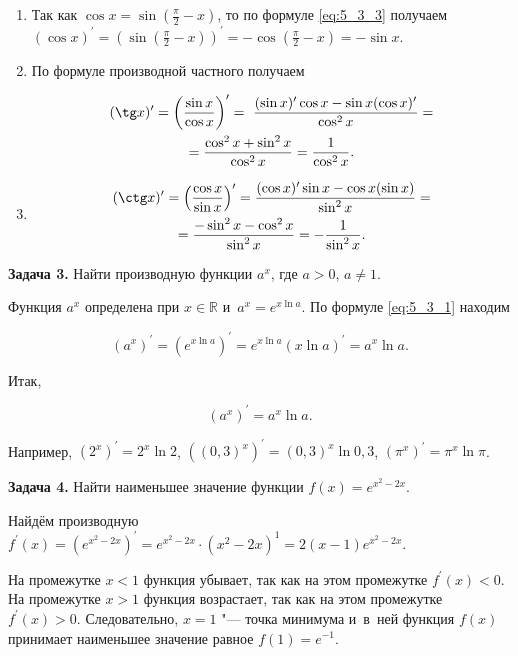 \begin{enumerate}
\item Так как $\displaystyle \cos x = \sin \left(\frac{\pi}{2} - x \right)$,
то по формуле \eqref{eq:5_3_3} получаем
$\displaystyle (\cos x)^\prime =
\left( \sin \left( \frac{\pi}{2} - x \right) \right)^\prime =
-\cos \left( \frac{\pi}{2} - x \right) = -\sin x$.

\item По формуле производной частного получаем

\begin{multline*}
\displaystyle (\tg x)^\prime = \left( \frac{\sin x }{\cos x} \right)^\prime =\
\frac{(\sin x)^\prime \cos x - \sin x (\cos x)^\prime}{\cos^{2} x} = \\
= \frac{\cos^{2} x + \sin^{2} x}{\cos^{2} x} = \frac{1}{\cos^{2} x}.
\end{multline*}

\item 
\begin{multline*}
\displaystyle (\ctg x)^\prime = \left( \frac{\cos x}{\sin x} \right)^\prime = 
\frac{(\cos x)^\prime \sin x - \cos x (\sin x)}{\sin^{2} x} = \\
= \frac{-\sin^{2} x - \cos^{2} x}{\sin^{2} x} = -\frac{1}{\sin^{2} x}.
\end{multline*}

\end{enumerate}

\textbf{Задача 3.}\label{ex:5_3_3} Найти производную функции $a^{x}$,
где $a >0$, $a \ne 1$.

Функция $a^{x}$ определена при $x \in \mathbb{R}$ и~$a^{x} = e^{x \ln a}$.
По формуле \eqref{eq:5_3_1} находим

\begin{equation*}
(a^{x})^\prime =
\left( e^{x \ln a} \right)^\prime =
e^{x \ln a} (x \ln a)^\prime =
a^{x} \ln a. 
\end{equation*}

Итак,

\begin{equation}\label{eq:5_3_4}
(a^{x})^\prime = a^{x} \ln a.
\end{equation}

\noindent
Например,
$(2^{x})^\prime = 2^{x} \ln 2$,
$\left( (0{,}3)^{x} \right)^\prime = (0{,}3)^{x} \ln 0{,}3$,
$(\pi^{x})^\prime = \pi^{x} \ln \pi$.

\textbf{Задача 4.}\label{ex:5_3_4} Найти наименьшее значение функции
$f(x) = e^{x^{2} - 2x}$.

Найдём производную
$f^\prime (x) = \left( e^{x^{2} - 2x} \right)^\prime =
e^{x^{2} - 2x} \cdot (x^{2} - 2x)^{1} = 2(x - 1)e^{x^{2} - 2x}$.

На промежутке $x < 1$ функция убывает, так как на этом промежутке $f^\prime (x) < 0$.
На промежутке $x > 1$ функция возрастает, так как на этом  промежутке $f^\prime (x) > 0$.
Следовательно, $x = 1$ "--- точка минимума и~в~ней функция $f(x)$
принимает наименьшее значение равное $f(1) = e^{-1}$.
